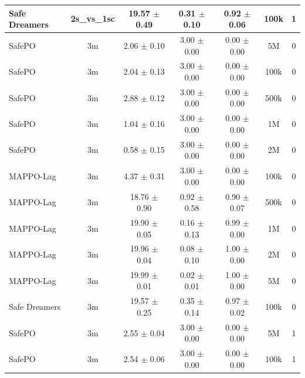 \documentclass{article}
\begin{document}
\begin{longtable}{lcccccc}
Safe Dreamers & 2s\_vs\_1sc & 19.57 $\pm$ 0.49 & 0.31 $\pm$ 0.10 & 0.92 $\pm$ 0.06 & 100k & 1 \\
\midrule
SafePO & 3m & \textcolor{green!60!black}{2.06 $\pm$ 0.10} & \textcolor{green!60!black}{3.00 $\pm$ 0.00} & \textcolor{green!60!black}{0.00 $\pm$ 0.00} & 5M & 0 \\
SafePO & 3m & \textcolor{green!60!black}{2.04 $\pm$ 0.13} & \textcolor{green!60!black}{3.00 $\pm$ 0.00} & \textcolor{green!60!black}{0.00 $\pm$ 0.00} & 100k & 0 \\
SafePO & 3m & \textcolor{green!60!black}{2.88 $\pm$ 0.12} & \textcolor{green!60!black}{3.00 $\pm$ 0.00} & \textcolor{green!60!black}{0.00 $\pm$ 0.00} & 500k & 0 \\
SafePO & 3m & \textcolor{green!60!black}{1.04 $\pm$ 0.16} & \textcolor{green!60!black}{3.00 $\pm$ 0.00} & \textcolor{green!60!black}{0.00 $\pm$ 0.00} & 1M & 0 \\
SafePO & 3m & \textcolor{green!60!black}{0.58 $\pm$ 0.15} & \textcolor{green!60!black}{3.00 $\pm$ 0.00} & \textcolor{green!60!black}{0.00 $\pm$ 0.00} & 2M & 0 \\
MAPPO-Lag & 3m & \textcolor{green!60!black}{4.37 $\pm$ 0.31} & \textcolor{green!60!black}{3.00 $\pm$ 0.00} & \textcolor{green!60!black}{0.00 $\pm$ 0.00} & 100k & 0 \\
MAPPO-Lag & 3m & \textcolor{green!60!black}{18.76 $\pm$ 0.90} & \textcolor{green!60!black}{0.92 $\pm$ 0.58} & \textcolor{green!60!black}{0.90 $\pm$ 0.07} & 500k & 0 \\
MAPPO-Lag & 3m & \textcolor{red!70!black}{19.90 $\pm$ 0.05} & \textcolor{red!70!black}{0.16 $\pm$ 0.13} & \textcolor{red!70!black}{0.99 $\pm$ 0.00} & 1M & 0 \\
MAPPO-Lag & 3m & \textcolor{red!70!black}{19.96 $\pm$ 0.04} & \textcolor{red!70!black}{0.08 $\pm$ 0.10} & \textcolor{red!70!black}{1.00 $\pm$ 0.00} & 2M & 0 \\
MAPPO-Lag & 3m & \textcolor{red!70!black}{19.99 $\pm$ 0.01} & \textcolor{red!70!black}{0.02 $\pm$ 0.01} & \textcolor{red!70!black}{1.00 $\pm$ 0.00} & 5M & 0 \\
Safe Dreamers & 3m & 19.57 $\pm$ 0.25 & 0.35 $\pm$ 0.14 & 0.97 $\pm$ 0.02 & 100k & 0 \\
\midrule
SafePO & 3m & \textcolor{green!60!black}{2.55 $\pm$ 0.04} & \textcolor{green!60!black}{3.00 $\pm$ 0.00} & \textcolor{green!60!black}{0.00 $\pm$ 0.00} & 5M & 1 \\
SafePO & 3m & \textcolor{green!60!black}{2.54 $\pm$ 0.06} & \textcolor{green!60!black}{3.00 $\pm$ 0.00} & \textcolor{green!60!black}{0.00 $\pm$ 0.00} & 100k & 1 \\

\end{longtable}
\end{document}
